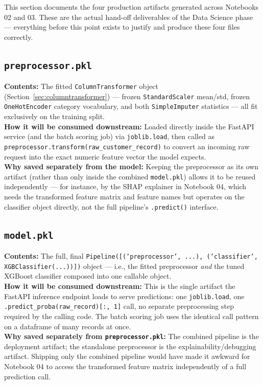 \documentclass[11pt]{article}
\begin{document}
This section documents the four production artifacts generated across Notebooks 02 and 03. These are the actual hand-off deliverables of the Data Science phase --- everything before this point exists to justify and produce these four files correctly.

\subsection{\texttt{preprocessor.pkl}}
\textbf{Contents:} The fitted \texttt{ColumnTransformer} object (Section~\ref{sec:columntransformer}) --- frozen \texttt{StandardScaler} mean/std, frozen \texttt{OneHotEncoder} category vocabulary, and both \texttt{SimpleImputer} statistics --- all fit exclusively on the training split.\\
\textbf{How it will be consumed downstream:} Loaded directly inside the FastAPI service (and the batch scoring job) via \texttt{joblib.load}, then called as \texttt{preprocessor.transform(raw\_customer\_record)} to convert an incoming raw request into the exact numeric feature vector the model expects.\\
\textbf{Why saved separately from the model:} Keeping the preprocessor as its own artifact (rather than only inside the combined \texttt{model.pkl}) allows it to be reused independently --- for instance, by the SHAP explainer in Notebook 04, which needs the transformed feature matrix and feature names but operates on the classifier object directly, not the full pipeline's \texttt{.predict()} interface.

\subsection{\texttt{model.pkl}}
\textbf{Contents:} The full, final \texttt{Pipeline([('preprocessor', ...), ('classifier', XGBClassifier(...))])} object --- i.e., the fitted preprocessor \emph{and} the tuned XGBoost classifier composed into one callable object.\\
\textbf{How it will be consumed downstream:} This is the single artifact the FastAPI inference endpoint loads to serve predictions: one \texttt{joblib.load}, one \texttt{.predict\_proba(raw\_record)[:, 1]} call, no separate preprocessing step required by the calling code. The batch scoring job uses the identical call pattern on a dataframe of many records at once.\\
\textbf{Why saved separately from \texttt{preprocessor.pkl}:} The combined pipeline is the deployment artifact; the standalone preprocessor is the explainability/debugging artifact. Shipping only the combined pipeline would have made it awkward for Notebook 04 to access the transformed feature matrix independently of a full prediction call.
\end{document}
